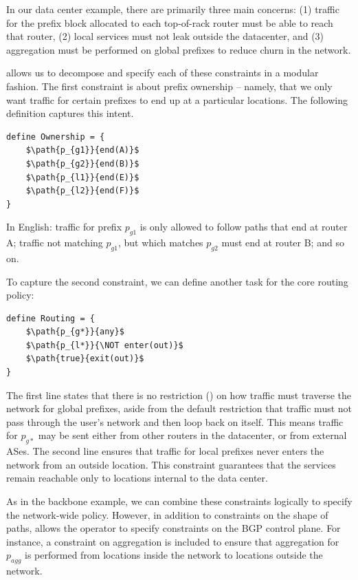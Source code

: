 In our data center example, 
there are primarily three main concerns: 
(1) traffic for the prefix block allocated to each top-of-rack router must be able to reach that router, 
(2) local services must not leak outside the datacenter, and 
(3) aggregation must be performed on global prefixes to reduce churn 
in the network. 

\sysname allows us to decompose and specify each of these constraints in a modular fashion. The first constraint is about prefix ownership -- namely, that we only want traffic for certain prefixes to end up at a particular locations. The following definition captures this intent.

\begin{lstlisting}[mathescape=true]
define Ownership = {
    $\path{p_{g1}}{end(A)}$
    $\path{p_{g2}}{end(B)}$
    $\path{p_{l1}}{end(E)}$
    $\path{p_{l2}}{end(F)}$
}
\end{lstlisting}

In English: traffic for prefix $p_{g1}$ is only allowed to follow paths that 
end at router A; traffic not matching $p_{g1}$, but which matches $p_{g2}$ must 
end at router B; and so on. 

To capture the second constraint, we can define another task for the core 
routing policy:

\begin{lstlisting}[mathescape=true]
define Routing = {
    $\path{p_{g*}}{any}$
    $\path{p_{l*}}{\NOT enter(out)}$
    $\path{true}{exit(out)}$
}
\end{lstlisting}

The first line states that there is no restriction ()
on how traffic must
traverse the network for global prefixes, aside from the default restriction
that traffic must not pass through the user's network and then loop
back on itself. This means traffic for
$p_{g*}$ may be sent either from other routers in the datacenter, or
from external ASes. The second line ensures that traffic for local
prefixes never enters the network from an outside location. This constraint
guarantees that the services remain reachable only to locations
internal to the data center.

As in the backbone example, we can combine these constraints 
logically to specify the network-wide policy.
However, in addition to constraints on the shape of paths, 
\sysname allows the operator to specify constraints on the BGP control plane. 
For instance, a constraint on aggregation is included to ensure that 
aggregation for $p_{agg}$ is performed from locations inside the network 
to locations outside the network. 

